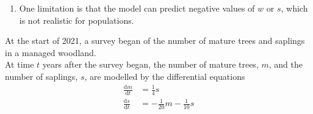 \documentclass[leqno]{article}
\begin{document}
\begin{enumerate}[
  label=\textbf{\arabic*.},
  leftmargin=*,
  topsep=0pt,
  partopsep=0pt,
  parsep=0pt
]
\begin{djsSolution}
\begin{enumerate}[label=\textbf{(\alph*)}]
  The waterweed is eliminated when \(w=0\), so set \(w(T)=0\):
  \[
  26e^T-4e^{2T}+8e^{-T}=0
  \]

  Multiply through by \(e^T\):
  \[
  26e^{2T}-4e^{3T}+8=0
  \]

  Let
  \[
  x=e^T
  \]

  where \(x>0\). Then
  \[
  26x^2-4x^3+8=0
  \]

  Rearranging:
  \[
  2x^3-13x^2-4=0
  \]

  Solving this cubic numerically gives the positive root
  \[
  x\approx 6.547
  \]

  Therefore
  \[
  T=\ln x\approx 1.879\qquad\text{(3 d.p.)}
  \]

  So the waterweed is eliminated after about \(1.879\) months.

  \item One limitation is that the model can predict negative values of \(w\) or \(s\), which is not realistic for populations.
\end{enumerate}
\end{djsSolution}


\newpage

\questionitem

At the start of 2021, a survey began of the number of mature trees and saplings in a managed woodland. \\

At time $t$ years after the survey began, the number of mature trees, $m$, and the number of saplings, $s$, are modelled by the differential equations \\
\begin{align*}
\frac{\mathrm{d}m}{\mathrm{d}t}&=\frac{1}{4}s \\[5pt]
\frac{\mathrm{d}s}{\mathrm{d}t}&=-\frac{1}{20}m-\frac{1}{10}s
\end{align*}


\end{enumerate}
\end{document}
